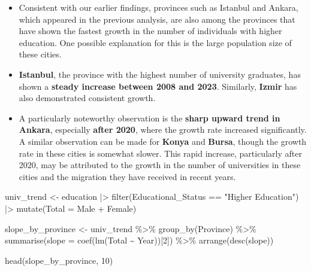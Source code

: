 \documentclass[
  11pt,
  a4paper,
  DIV=11,
  numbers=noendperiod]{scrartcl}
\newenvironment{Shaded}{\begin{snugshade}}{\end{snugshade}}
\newcommand{\AttributeTok}[1]{\textcolor[rgb]{0.40,0.45,0.13}{#1}}
\newcommand{\DecValTok}[1]{\textcolor[rgb]{0.68,0.00,0.00}{#1}}
\newcommand{\FunctionTok}[1]{\textcolor[rgb]{0.28,0.35,0.67}{#1}}
\newcommand{\NormalTok}[1]{\textcolor[rgb]{0.00,0.23,0.31}{#1}}
\newcommand{\OtherTok}[1]{\textcolor[rgb]{0.00,0.23,0.31}{#1}}
\newcommand{\SpecialCharTok}[1]{\textcolor[rgb]{0.37,0.37,0.37}{#1}}
\newcommand{\StringTok}[1]{\textcolor[rgb]{0.13,0.47,0.30}{#1}}
\begin{document}
\begin{itemize}
\item
  Consistent with our earlier findings, provinces such as Istanbul and
  Ankara, which appeared in the previous analysis, are also among the
  provinces that have shown the fastest growth in the number of
  individuals with higher education. One possible explanation for this
  is the large population size of these cities.
\item
  {\textbf{Istanbul}}, the province with the highest number of
  university graduates, has shown a {\textbf{steady increase between
  2008 and 2023}}. Similarly, {\textbf{Izmir}} has also demonstrated
  consistent growth.
\item
  A particularly noteworthy observation is the {\textbf{sharp upward
  trend in Ankara}}, especially {\textbf{after 2020}}, where the growth
  rate increased significantly. A similar observation can be made for
  {\textbf{Konya}} and {\textbf{Bursa}}, though the growth rate in these
  cities is somewhat slower. This rapid increase, particularly after
  2020, may be attributed to the growth in the number of universities in
  these cities and the migration they have received in recent years.
\end{itemize}

\begin{Shaded}
\begin{Highlighting}[]
\NormalTok{univ\_trend }\OtherTok{\textless{}{-}}\NormalTok{ education }\SpecialCharTok{|\textgreater{}}
  \FunctionTok{filter}\NormalTok{(Educational\_Status }\SpecialCharTok{==} \StringTok{"Higher Education"}\NormalTok{) }\SpecialCharTok{|\textgreater{}}
  \FunctionTok{mutate}\NormalTok{(}\AttributeTok{Total =}\NormalTok{ Male }\SpecialCharTok{+}\NormalTok{ Female)}

\NormalTok{slope\_by\_province }\OtherTok{\textless{}{-}}\NormalTok{ univ\_trend }\SpecialCharTok{\%\textgreater{}\%}
  \FunctionTok{group\_by}\NormalTok{(Province) }\SpecialCharTok{\%\textgreater{}\%}
  \FunctionTok{summarise}\NormalTok{(}\AttributeTok{slope =} \FunctionTok{coef}\NormalTok{(}\FunctionTok{lm}\NormalTok{(Total }\SpecialCharTok{\textasciitilde{}}\NormalTok{ Year))[}\DecValTok{2}\NormalTok{]) }\SpecialCharTok{\%\textgreater{}\%}
  \FunctionTok{arrange}\NormalTok{(}\FunctionTok{desc}\NormalTok{(slope))}

\FunctionTok{head}\NormalTok{(slope\_by\_province, }\DecValTok{10}\NormalTok{)}
\end{Highlighting}
\end{Shaded}
\end{document}
